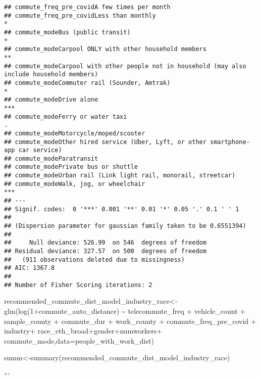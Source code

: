 \documentclass[
]{article}
\newenvironment{Shaded}{\begin{snugshade}}{\end{snugshade}}
\newcommand{\AttributeTok}[1]{\textcolor[rgb]{0.77,0.63,0.00}{#1}}
\newcommand{\DecValTok}[1]{\textcolor[rgb]{0.00,0.00,0.81}{#1}}
\newcommand{\FunctionTok}[1]{\textcolor[rgb]{0.00,0.00,0.00}{#1}}
\newcommand{\NormalTok}[1]{#1}
\newcommand{\OtherTok}[1]{\textcolor[rgb]{0.56,0.35,0.01}{#1}}
\newcommand{\SpecialCharTok}[1]{\textcolor[rgb]{0.00,0.00,0.00}{#1}}
\begin{document}
\begin{verbatim}
## commute_freq_pre_covidA few times per month                                                    
## commute_freq_pre_covidLess than monthly                                                     *  
## commute_modeBus (public transit)                                                            *  
## commute_modeCarpool ONLY with other household members                                       ** 
## commute_modeCarpool with other people not in household (may also include household members)    
## commute_modeCommuter rail (Sounder, Amtrak)                                                 *  
## commute_modeDrive alone                                                                     ***
## commute_modeFerry or water taxi                                                             .  
## commute_modeMotorcycle/moped/scooter                                                           
## commute_modeOther hired service (Uber, Lyft, or other smartphone-app car service)              
## commute_modeParatransit                                                                        
## commute_modePrivate bus or shuttle                                                             
## commute_modeUrban rail (Link light rail, monorail, streetcar)                                  
## commute_modeWalk, jog, or wheelchair                                                        ***
## ---
## Signif. codes:  0 '***' 0.001 '**' 0.01 '*' 0.05 '.' 0.1 ' ' 1
## 
## (Dispersion parameter for gaussian family taken to be 0.6551394)
## 
##     Null deviance: 526.99  on 546  degrees of freedom
## Residual deviance: 327.57  on 500  degrees of freedom
##   (911 observations deleted due to missingness)
## AIC: 1367.8
## 
## Number of Fisher Scoring iterations: 2
\end{verbatim}

\begin{Shaded}
\begin{Highlighting}[]
\NormalTok{recommended\_commute\_dist\_model\_industry\_race}\OtherTok{\textless{}{-}}\FunctionTok{glm}\NormalTok{(}\FunctionTok{log}\NormalTok{(}\DecValTok{1}\SpecialCharTok{+}\NormalTok{commute\_auto\_distance) }\SpecialCharTok{\textasciitilde{}}\NormalTok{ telecommute\_freq }\SpecialCharTok{+}\NormalTok{ vehicle\_count }\SpecialCharTok{+} 
\NormalTok{    sample\_county }\SpecialCharTok{+}\NormalTok{ commute\_dur }\SpecialCharTok{+}\NormalTok{ work\_county }\SpecialCharTok{+}\NormalTok{ commute\_freq\_pre\_covid }\SpecialCharTok{+}\NormalTok{ industry}\SpecialCharTok{+}\NormalTok{ race\_eth\_broad}\SpecialCharTok{+}\NormalTok{gender}\SpecialCharTok{+}\NormalTok{numworkers}\SpecialCharTok{+}
\NormalTok{    commute\_mode,}\AttributeTok{data=}\NormalTok{people\_with\_work\_dist)}

\NormalTok{summ}\OtherTok{\textless{}{-}}\FunctionTok{summary}\NormalTok{(recommended\_commute\_dist\_model\_industry\_race)}
\end{Highlighting}
\end{Shaded}

```
\end{document}
